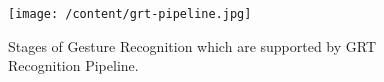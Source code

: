 \begin{figure}
	[h]
	\texttt{[image: /content/grt-pipeline.jpg]} \caption{Stages of Gesture Recognition which are supported by GRT Recognition Pipeline. \cite{16} } \label{fg:grt:pipeline} 
\end{figure}
